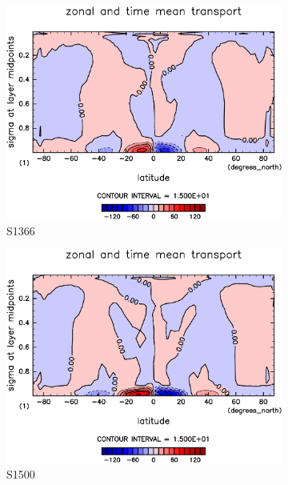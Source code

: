 \documentclass[body]{subfiles}
\begin{document}
\begin{figure}[t]
	\centering
	\begin{subfigure}{.4\textwidth}
		\centering
		\includegraphics[width=\textwidth]{S1366/MeriHeatTransTest@latentEn_M,time=14600:14965-crop-rotate.pdf}
		\caption{S1366}\label{潜熱平均子午面循環S1366}
	\end{subfigure}
	\begin{subfigure}{.4\textwidth}
		\centering
		\includegraphics[width=\textwidth]{S1500/MeriHeatTransTest@latentEn_M,time=3650:4015-crop-rotate.pdf}
		\caption{S1500}\label{潜熱平均子午面循環S1500}
	\end{subfigure}
	\begin{subfigure}{.4\textwidth}

\end{subfigure}
\end{figure}
\end{document}
